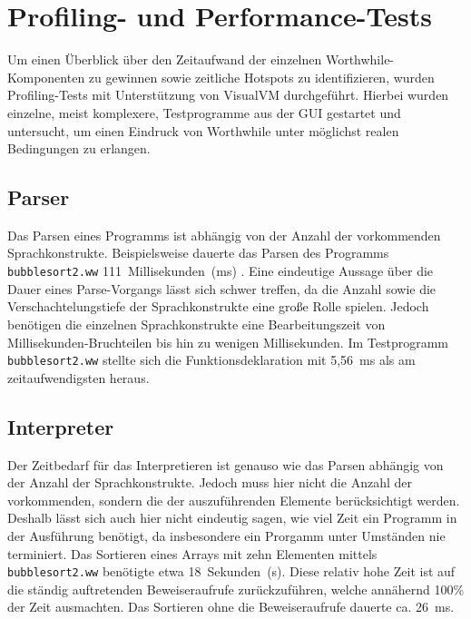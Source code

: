 \section{Profiling- und Performance-Tests}
Um einen Überblick über den Zeitaufwand der einzelnen Worthwhile-Komponenten zu gewinnen sowie zeitliche Hotspots zu identifizieren, wurden Profiling-Tests mit Unterstützung von VisualVM durchgeführt. Hierbei wurden einzelne, meist komplexere, Testprogramme aus der GUI gestartet und untersucht, um einen Eindruck von Worthwhile unter möglichst realen Bedingungen zu erlangen.

\subsection{Parser}
Das Parsen eines Programms ist abhängig von der Anzahl der vorkommenden Sprachkonstrukte. Beispielsweise dauerte das Parsen des Programms \texttt{bubblesort2.ww} 111~Millisekunden~(ms) . Eine eindeutige Aussage über die Dauer eines Parse-Vorgangs lässt sich schwer treffen, da die Anzahl sowie die Verschachtelungstiefe der Sprachkonstrukte eine große Rolle spielen. Jedoch benötigen die einzelnen Sprachkonstrukte eine Bearbeitungszeit von Millisekunden-Bruchteilen bis hin zu wenigen Millisekunden. Im Testprogramm \texttt{bubblesort2.ww} stellte sich die Funktionsdeklaration mit 5,56~ms als am zeitaufwendigsten heraus.

\subsection{Interpreter}
Der Zeitbedarf für das Interpretieren ist genauso wie das Parsen abhängig von der Anzahl der Sprachkonstrukte. Jedoch muss hier nicht die Anzahl der vorkommenden, sondern die der auszuführenden Elemente berücksichtigt werden. Deshalb lässt sich auch hier nicht eindeutig sagen, wie viel Zeit ein Programm in der Ausführung benötigt, da insbesondere ein Prorgamm unter Umständen nie terminiert. Das Sortieren eines Arrays mit zehn Elementen mittels \texttt{bubblesort2.ww} benötigte etwa 18~Sekunden~(s). Diese relativ hohe Zeit ist auf die ständig auftretenden Beweiseraufrufe zurückzuführen, welche annähernd 100\% der Zeit ausmachten. Das Sortieren ohne die Beweiseraufrufe dauerte ca. 26~ms.

